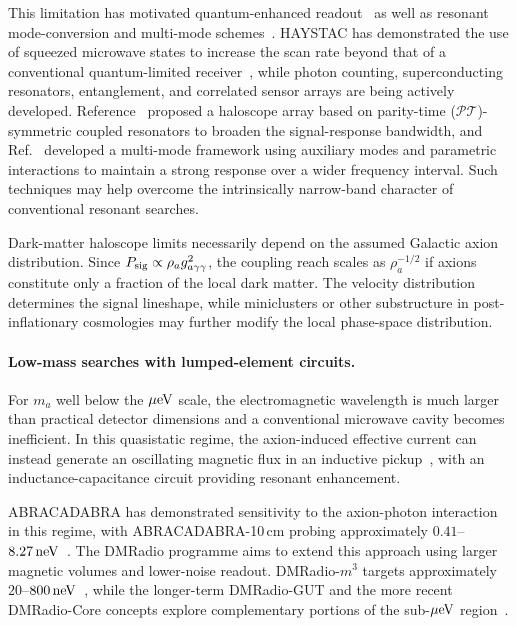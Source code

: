 \documentclass[review]{elsarticle}
\numberwithin{equation}{section}
\numberwithin{table}{section}
\numberwithin{figure}{section}
\begin{document}
This limitation has motivated quantum-enhanced readout~\cite{Lamoreaux:2013koa,Zheng:2016qjv,Dixit:2020ymh} as well as resonant mode-conversion and multi-mode schemes~\cite{Sikivie:2010fa,Goryachev:2018vjt,Berlin:2019ahk,Berlin:2020vrk}. HAYSTAC has demonstrated the use of squeezed microwave states to increase the scan rate beyond that of a conventional quantum-limited receiver~\cite{HAYSTAC:2020kwv,HAYSTAC:2024jch}, while photon counting, superconducting resonators, entanglement, and correlated sensor arrays are being actively developed. Reference~\cite{Chen:2021bgy} proposed a haloscope array based on parity-time ($\mathcal{PT}$)-symmetric coupled resonators to broaden the signal-response bandwidth, and Ref.~\cite{Chen:2023ryb} developed a multi-mode framework using auxiliary modes and parametric interactions to maintain a strong response over a wider frequency interval. Such techniques may help overcome the intrinsically narrow-band character of conventional resonant searches.

Dark-matter haloscope limits necessarily depend on the assumed Galactic axion distribution. Since $P_{\rm sig}\propto\rho_a g_{a\gamma\gamma}^2$, the coupling reach scales as $\rho_a^{-1/2}$ if axions constitute only a fraction of the local dark matter. The velocity distribution determines the signal lineshape, while miniclusters or other substructure in post-inflationary cosmologies may further modify the local phase-space distribution.

\paragraph{Low-mass searches with lumped-element circuits.}

For $m_a$ well below the $\mu{\rm eV}$ scale, the electromagnetic wavelength is much larger than practical detector dimensions and a conventional microwave cavity becomes inefficient. In this quasistatic regime, the axion-induced effective current can instead generate an oscillating magnetic flux in an inductive pickup~\cite{Kahn:2016aff}, with an inductance-capacitance circuit providing resonant enhancement.

ABRACADABRA has demonstrated sensitivity to the axion-photon interaction in this regime, with ABRACADABRA-10\,cm probing approximately $0.41$--$8.27\,{\rm neV}$~\cite{Salemi:2021gck}. The DMRadio programme aims to extend this approach using larger magnetic volumes and lower-noise readout. DMRadio-$m^3$ targets approximately $20$--$800\,{\rm neV}$~\cite{DMRadio:2022pkf}, while the longer-term DMRadio-GUT and the more recent DMRadio-Core concepts explore complementary portions of the sub-$\mu{\rm eV}$ region~\cite{DMRadio:2022jfv,Ankel:2026zrv}.
\end{document}
